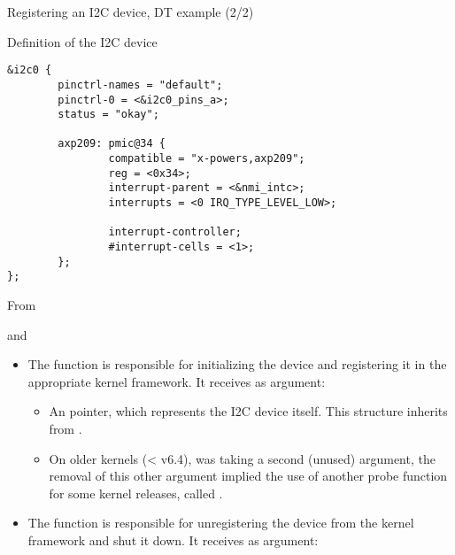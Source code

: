 \begin{frame}[fragile]{Registering an I2C device, DT example (2/2)}
  \begin{block}{Definition of the I2C device}
    \begin{verbatim}
&i2c0 {
        pinctrl-names = "default";
        pinctrl-0 = <&i2c0_pins_a>;
        status = "okay";

        axp209: pmic@34 {
                compatible = "x-powers,axp209";
                reg = <0x34>;
                interrupt-parent = <&nmi_intc>;
                interrupts = <0 IRQ_TYPE_LEVEL_LOW>;

                interrupt-controller;
                #interrupt-cells = <1>;
        };
};
    \end{verbatim}
  \end{block}
  From 
\end{frame}

\begin{frame}{ and }
  \begin{itemize}
  \item The  function is responsible for initializing
    the device and registering it in the appropriate kernel
    framework. It receives as argument:
    \begin{itemize}
    \item An  pointer, which represents the I2C
      device itself. This structure inherits from .
    \item On older kernels (< v6.4),  was taking a second (unused)
      argument, the removal of this other argument implied the use of another
      probe function for some kernel releases, called .
    \end{itemize}
  \item The  function is responsible for
    unregistering the device from the kernel framework and shut it
    down. It receives as argument:
  \end{itemize}
\end{frame}

